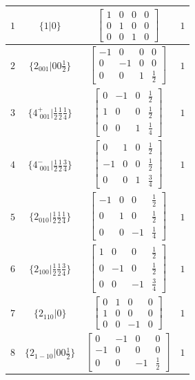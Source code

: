 \documentclass[fleqn,8pt]{jsarticle}
\begin{document}
\begin{longtable}{cccc}
$ 1 $ & $ \{1|0\} $ & $ \begin{bmatrix} 1 & 0 & 0 & 0 \\ 0 & 1 & 0 & 0 \\ 0 & 0 & 1 & 0 \end{bmatrix} $ & $ 1 $ \\ \hline
$ 2 $ & $ \{2{}_{001}|0 0 \frac{1}{2}\} $ & $ \begin{bmatrix} -1 & 0 & 0 & 0 \\ 0 & -1 & 0 & 0 \\ 0 & 0 & 1 & \frac{1}{2} \end{bmatrix} $ & $ 1 $ \\ \hline
$ 3 $ & $ \{4^{+}_{\,\,001}|\frac{1}{2} \frac{1}{2} \frac{1}{4}\} $ & $ \begin{bmatrix} 0 & -1 & 0 & \frac{1}{2} \\ 1 & 0 & 0 & \frac{1}{2} \\ 0 & 0 & 1 & \frac{1}{4} \end{bmatrix} $ & $ 1 $ \\ \hline
$ 4 $ & $ \{4^{-}_{\,\,001}|\frac{1}{2} \frac{1}{2} \frac{3}{4}\} $ & $ \begin{bmatrix} 0 & 1 & 0 & \frac{1}{2} \\ -1 & 0 & 0 & \frac{1}{2} \\ 0 & 0 & 1 & \frac{3}{4} \end{bmatrix} $ & $ 1 $ \\ \hline
$ 5 $ & $ \{2{}_{010}|\frac{1}{2} \frac{1}{2} \frac{1}{4}\} $ & $ \begin{bmatrix} -1 & 0 & 0 & \frac{1}{2} \\ 0 & 1 & 0 & \frac{1}{2} \\ 0 & 0 & -1 & \frac{1}{4} \end{bmatrix} $ & $ 1 $ \\ \hline
$ 6 $ & $ \{2{}_{100}|\frac{1}{2} \frac{1}{2} \frac{3}{4}\} $ & $ \begin{bmatrix} 1 & 0 & 0 & \frac{1}{2} \\ 0 & -1 & 0 & \frac{1}{2} \\ 0 & 0 & -1 & \frac{3}{4} \end{bmatrix} $ & $ 1 $ \\ \hline
$ 7 $ & $ \{2{}_{110}|0\} $ & $ \begin{bmatrix} 0 & 1 & 0 & 0 \\ 1 & 0 & 0 & 0 \\ 0 & 0 & -1 & 0 \end{bmatrix} $ & $ 1 $ \\ \hline
$ 8 $ & $ \{2{}_{1-10}|0 0 \frac{1}{2}\} $ & $ \begin{bmatrix} 0 & -1 & 0 & 0 \\ -1 & 0 & 0 & 0 \\ 0 & 0 & -1 & \frac{1}{2} \end{bmatrix} $ & $ 1 $ \\
\end{longtable}
\end{document}
